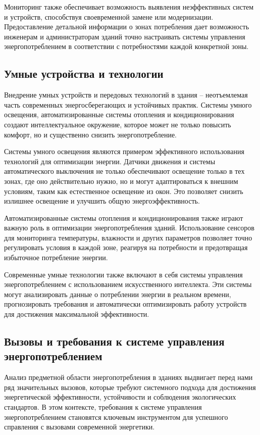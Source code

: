 Мониторинг также обеспечивает возможность выявления неэффективных систем и устройств, способствуя своевременной замене или модернизации. Предоставление детальной информации о зонах потребления дает возможность инженерам и администраторам зданий точно настраивать системы управления энергопотреблением в соответствии с потребностями каждой конкретной зоны.

\subsection{Умные устройства и технологии}

Внедрение умных устройств и передовых технологий в здания – неотъемлемая часть современных энергосберегающих и устойчивых практик. Системы умного освещения, автоматизированные системы отопления и кондиционирования создают интеллектуальное окружение, которое может не только повысить комфорт, но и существенно снизить энергопотребление.

Системы умного освещения являются примером эффективного использования технологий для оптимизации энергии. Датчики движения и системы автоматического выключения не только обеспечивают освещение только в тех зонах, где оно действительно нужно, но и могут адаптироваться к внешним условиям, таким как естественное освещение из окон. Это позволяет снизить излишнее освещение и улучшить общую энергоэффективность.

Автоматизированные системы отопления и кондиционирования также играют важную роль в оптимизации энергопотребления зданий. Использование сенсоров для мониторинга температуры, влажности и других параметров позволяет точно регулировать условия в каждой зоне, реагируя на потребности и предотвращая избыточное потребление энергии.

Современные умные технологии также включают в себя системы управления энергопотреблением с использованием искусственного интеллекта. Эти системы могут анализировать данные о потреблении энергии в реальном времени, прогнозировать требования и автоматически оптимизировать работу устройств для достижения максимальной эффективности.

\subsection{Вызовы и требования к системе управления энергопотреблением}

Анализ предметной области энергопотребления в зданиях выдвигает перед нами ряд значительных вызовов, которые требуют системного подхода для достижения энергетической эффективности, устойчивости и соблюдения экологических стандартов. В этом контексте, требования к системе управления энергопотреблением становятся ключевым инструментом для успешного справления с вызовами современной энергетики.

